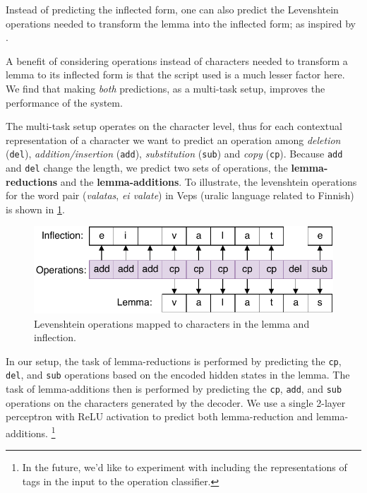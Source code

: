 \documentclass[11pt,a4paper]{article}
\begin{document}
Instead of predicting the inflected form, one can also predict the
Levenshtein operations needed to transform the lemma into the
inflected form; as inspired by \cite{DBLP:conf/conll/MakarovRC17}.

A benefit of considering operations instead of characters needed to
transform a lemma to its inflected form is that the script used is a
much lesser factor here. We find that making \emph{both} predictions,
as a multi-task setup, improves the performance of the system.

The multi-task setup operates on the character level, thus for each
contextual representation of a character we want to predict an
operation among \textit{deletion} (\texttt{del}),
\textit{addition/insertion} (\texttt{add}), \textit{substitution}
(\texttt{sub}) and \textit{copy} (\texttt{cp}). Because \texttt{add}
and \texttt{del} change the length, we predict two sets of operations,
the \textbf{lemma-reductions} and the \textbf{lemma-additions}. To
illustrate, the levenshtein operations for the word pair
(\emph{valatas}, \emph{ei valate}) in Veps (uralic language related to
Finnish) is shown in \cref{fig:ops}.


\begin{figure}[ht]
\centering
\includegraphics[scale=0.5]{ops.pdf}
\caption{\label{fig:ops} Levenshtein operations mapped to characters in the lemma and
inflection.}
\end{figure}

In our setup, the task of lemma-reductions is performed by predicting
the \texttt{cp}, \texttt{del}, and \texttt{sub} operations based on
the encoded hidden states in the lemma.  The task of lemma-additions
then is performed by predicting the \texttt{cp}, \texttt{add}, and
\texttt{sub} operations on the characters generated by the decoder.
We use a single 2-layer perceptron with ReLU activation to predict
both lemma-reduction and lemma-additions. \footnote{In the future,
we'd like to experiment with including the representations of tags in
the input to the operation classifier.}
\end{document}
